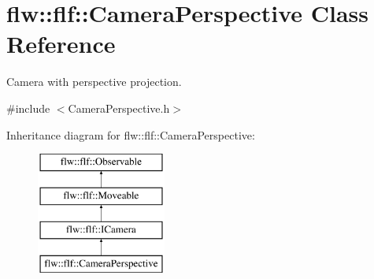 \hypertarget{classflw_1_1flf_1_1CameraPerspective}{}\section{flw\+:\+:flf\+:\+:Camera\+Perspective Class Reference}
\label{classflw_1_1flf_1_1CameraPerspective}


Camera with perspective projection.  




{\ttfamily \#include $<$Camera\+Perspective.\+h$>$}

Inheritance diagram for flw\+:\+:flf\+:\+:Camera\+Perspective\+:\begin{figure}[H]
\begin{center}
\leavevmode
\includegraphics[height=4.000000cm]{classflw_1_1flf_1_1CameraPerspective}
\end{center}
\end{figure}
